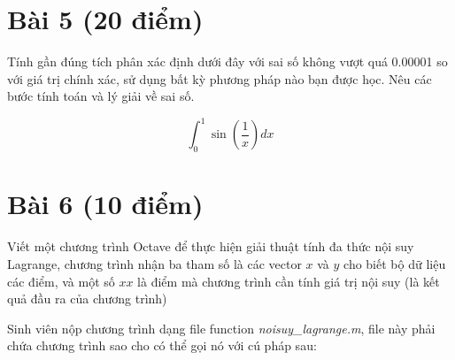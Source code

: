 \documentclass[12pt]{article}
\begin{document}

% 
% 

\section{Bài 5 (20 điểm)}

Tính gần đúng tích phân xác định dưới đây với sai số không vượt quá 0.00001 so với giá trị chính xác, sử dụng bất kỳ phương pháp nào bạn được học. Nêu các bước tính toán và lý giải về sai số.

\[\int_{0}^1  \sin \left( \frac 1 x \right) dx \]

\section{Bài 6 (10 điểm)}
Viết một chương trình Octave để thực hiện giải thuật tính đa thức nội suy Lagrange, chương trình nhận ba tham số là các vector $x$ và $y$ cho biết bộ dữ liệu các điểm, và một số $xx$ là điểm mà chương trình cần tính giá trị nội suy (là kết quả đầu ra của chương trình)

Sinh viên nộp chương trình dạng file function \emph{noisuy\_lagrange.m}, file này phải chứa chương trình sao cho có thể gọi nó với cú pháp sau:
\end{document}
